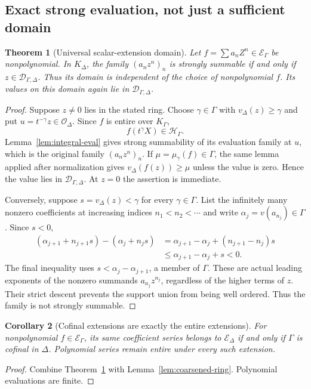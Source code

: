 \documentclass[11pt,letterpaper]{article}
\numberwithin{equation}{section}
\newtheorem{theorem}{Theorem}[section]
\newtheorem{corollary}[theorem]{Corollary}
\theoremstyle{definition}
\theoremstyle{remark}
\begin{document}
\subsection{Exact strong evaluation, not just a sufficient domain}
\begin{theorem}[Universal scalar-extension domain]\label{thm:extension}
Let $f=\sum a_nZ^n\in\mathcal E_\Gamma$ be nonpolynomial. In $K_\Delta$,
the family $(a_nz^n)_n$ is strongly summable if and only if
$z\in\mathcal D_{\Gamma,\Delta}$. Thus its domain is independent of the
choice of nonpolynomial $f$. Its values on this domain again lie in
$\mathcal D_{\Gamma,\Delta}$.
\end{theorem}
\begin{proof}
Suppose $z\ne0$ lies in the stated ring. Choose $\gamma\in\Gamma$ with
$v_\Delta(z)\ge\gamma$ and put $u=t^{-\gamma}z\in\mathcal O_\Delta$.
Since $f$ is entire over $K_\Gamma$,
\[
 f(t^\gamma X)\in\mathcal H_\Gamma.
\]
Lemma~\ref{lem:integral-eval} gives strong summability of its evaluation
family at $u$, which is the original family $(a_nz^n)_n$. If
$\mu=\mu_\gamma(f)\in\Gamma$, the same lemma applied after normalization
gives $v_\Delta(f(z))\ge\mu$ unless the value is zero. Hence the value lies
in $\mathcal D_{\Gamma,\Delta}$. At $z=0$ the assertion is immediate.

Conversely, suppose $s=v_\Delta(z)<\gamma$ for every $\gamma\in\Gamma$.
List the infinitely many nonzero coefficients at increasing indices
$n_1<n_2<\cdots$ and write $\alpha_j=v(a_{n_j})\in\Gamma$. Since $s<0$,
\begin{align*}
 (\alpha_{j+1}+n_{j+1}s)-(\alpha_j+n_js)
 &=\alpha_{j+1}-\alpha_j+(n_{j+1}-n_j)s\\
 &\le\alpha_{j+1}-\alpha_j+s<0.
\end{align*}
The final inequality uses $s<\alpha_j-\alpha_{j+1}$, a member of $\Gamma$.
These are actual leading exponents of the nonzero summands $a_{n_j}z^{n_j}$,
regardless of the higher terms of $z$. Their strict descent prevents the
support union from being well ordered. Thus the family is not strongly
summable.
\end{proof}

\begin{corollary}[Cofinal extensions are exactly the entire extensions]
\label{cor:entire-extension}
For nonpolynomial $f\in\mathcal E_\Gamma$, its same coefficient series
belongs to $\mathcal E_\Delta$ if and only if $\Gamma$ is cofinal in $\Delta$.
Polynomial series remain entire under every such extension.
\end{corollary}
\begin{proof}
Combine Theorem~\ref{thm:extension} with
Lemma~\ref{lem:coarsened-ring}. Polynomial evaluations are finite.
\end{proof}
\end{document}
